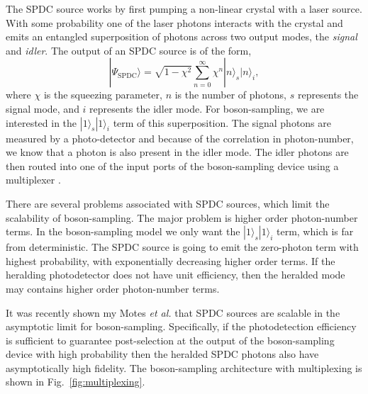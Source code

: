 \documentclass[aps,pra,twocolumn,amsmath,amssymb,nofootinbib,superscriptaddress]{revtex4}
\newcommand{\ket}[1]{|#1\rangle}
\begin{document}
The SPDC source works by first pumping a non-linear crystal with a laser source. With some probability one of the laser photons interacts with the crystal and emits an entangled superposition of photons across two output modes, the \emph{signal} and \emph{idler}. The output of an SPDC source is of the form,
\begin{equation} \label{SPDC}
\ket{\Psi_\mathrm{SPDC}} = \sqrt{1-\chi^2}\sum_{n=0}^{\infty}\chi^n\ket{n}_s\ket{n}_i,
\end{equation}
where $\chi$ is the squeezing parameter, $n$ is the number of photons, $s$ represents the signal mode, and $i$ represents the idler mode. For boson-sampling, we are interested in the $\ket{1}_s\ket{1}_i$ term of this superposition. The signal photons are measured by a photo-detector and because of the correlation in photon-number, we know that a photon is also present in the idler mode. The idler photons are then routed into one of the input ports of the boson-sampling device using a multiplexer \cite{bib:migdall2002tailoring, bib:LPOR201400027, bib:ma2011experimental}.

There are several problems associated with SPDC sources, which limit the scalability of boson-sampling. The major problem is higher order photon-number terms. In the boson-sampling model we only want the $\ket{1}_s\ket{1}_i$ term, which is far from deterministic. The SPDC source is going to emit the zero-photon term with highest probability, with exponentially decreasing higher order terms. If the heralding photodetector does not have unit efficiency, then the heralded mode may contains higher order photon-number terms.

It was recently shown my Motes \emph{et al.} \cite{bib:motes2013spontaneous} that SPDC sources are scalable in the asymptotic limit for boson-sampling. Specifically, if the photodetection efficiency is sufficient to guarantee post-selection at the output of the boson-sampling device with high probability then the heralded SPDC photons also have asymptotically high fidelity. The boson-sampling architecture with multiplexing is shown in Fig.~\ref{fig:multiplexing}. 
\end{document}
